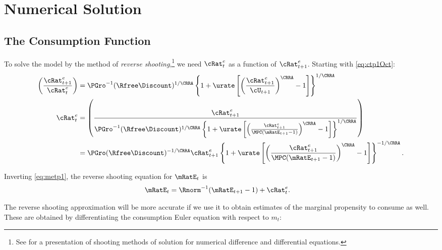 \documentclass{handout}
\begin{document}
\section{Numerical Solution}

\subsection{The Consumption Function}

To solve the model by the method of {\it reverse shooting},\footnote{See \cite{judd:book} for a presentation of shooting methods of solution for numerical difference and differential equations.} we need ${\cRat}^{e}_{t}$ as a function
of ${\cRat}^{e}_{t+1}$.  Starting with \eqref{eq:ctp1Oct}:
\begin{equation}\begin{gathered}\begin{aligned}
         \left(\frac{{\cRat}^{e}_{t+1}}{{\cRat}^{e}_{t}}\right) & =  \PGro^{-1} (\Rfree\Discount)^{1/\CRRA} \left\{1+\urate\left[\left(\frac{{\cRat}^{e}_{t+1}}{\cU_{t+1}}\right)^{\CRRA}-1\right]\right\}^{1/\CRRA}
\\       {\cRat}^{e}_{t} & =  \left(\frac{{\cRat}^{e}_{t+1}}{\PGro^{-1} (\Rfree\Discount)^{1/\CRRA} \left\{1+\urate\left[\left(\frac{{\cRat}^{e}_{t+1}}{\MPCU (\mRatE_{t+1}-1)}\right)^{\CRRA}-1\right]\right\}^{1/\CRRA} }  \right)
\\        & =  \PGro (\Rfree\Discount)^{-1/\CRRA} {\cRat}^{e}_{t+1}\left\{1+\urate\left[\left(\frac{{\cRat}^{e}_{t+1}}{\MPCU (\mRatE_{t+1}-1)}\right)^{\CRRA}-1\right]\right\}^{-1/\CRRA}        \label{eq:cReverse}.
\end{aligned}\end{gathered}\end{equation}

Inverting \eqref{eq:metp1}, the reverse shooting equation for $\mRatE_{t}$ is
\begin{equation}\begin{gathered}\begin{aligned}
        \mRatE_{t} & =  \Rnorm^{-1} (\mRatE_{t+1}-1)+{\cRat}^{e}_{t} . \label{eq:mReverse}
\end{aligned}\end{gathered}\end{equation}

The reverse shooting approximation will be more accurate if we use it to obtain estimates
of the marginal propensity to consume as well.  These are obtained 
by differentiating the consumption Euler equation with respect to $m_{t}$:
\end{document}
